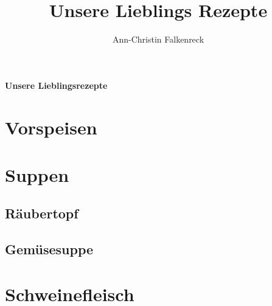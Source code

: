 \documentclass[ngerman,11pt,parskip=half,a5paper,twoside]{scrbook}
\author{Ann-Christin Falkenreck}
\title{Unsere Lieblings Rezepte}
\begin{document}
	\begin{titlepage}
		
	\vspace* {7cm}
		
	\begin{center}
		{\bfseries\huge Unsere Lieblingsrezepte }
	\end{center}
	
		
		

	\end{titlepage}
	
\tableofcontents

	
\chapter{Vorspeisen}

\clearpage
		
\chapter{Suppen}	

\clearpage

	\section{Räubertopf} 
	 
	\clearpage
	
	\section{Gemüsesuppe} 
	 
	\clearpage

\chapter{Schweinefleisch}

\clearpage
\end{document}
